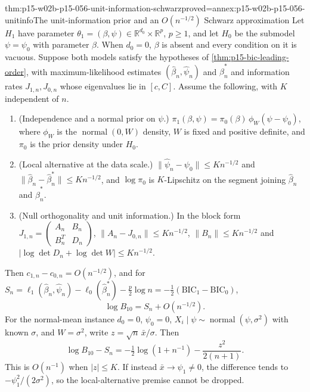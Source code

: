 \begin{hbtheorem}{thm:p15-w02b-p15-056-unit-information-schwarz}{proved=annex:p15-w02b-p15-056-unitinfo}{The unit-information prior and an \(O(n^{-1/2})\) Schwarz approximation}
Let \(H_1\) have parameter \(\theta_1=(\beta,\psi)\in\mathbb R^{d_0}\times\mathbb R^p\),
\(p\geq1\), and let \(H_0\) be the submodel \(\psi=\psi_0\) with
parameter \(\beta\). When \(d_0=0\), \(\beta\) is absent and every
condition on it is vacuous. Suppose both models satisfy the hypotheses
of \cref{thm:p15-bic-leading-order}, with maximum-likelihood estimates
\((\widehat\beta_n,\widehat\psi_n)\) and \(\widehat\beta^*_n\) and
information rates \(J_{1,n},J_{0,n}\) whose eigenvalues lie in
\([c,C]\). Assume the following, with \(K\) independent of \(n\).
\begin{enumerate}
\item (Independence and a normal prior on \(\psi\).)
\(\pi_1(\beta,\psi)=\pi_0(\beta)\,\phi_W(\psi-\psi_0)\), where \(\phi_W\)
is the \(\operatorname{normal}(0,W)\) density, \(W\) is fixed and
positive definite, and \(\pi_0\) is the prior density under \(H_0\).
\item (Local alternative at the data scale.)
\(\|\widehat\psi_n-\psi_0\|\leq Kn^{-1/2}\) and
\(\|\widehat\beta_n-\widehat\beta^*_n\|\leq Kn^{-1/2}\), and
\(\log\pi_0\) is \(K\)-Lipschitz on the segment joining
\(\widehat\beta_n\) and \(\widehat\beta^*_n\).
\item (Null orthogonality and unit information.) In the block form
\(J_{1,n}=\left(\begin{smallmatrix}A_n&B_n\\B_n^T&D_n\end{smallmatrix}\right)\),
\(\|A_n-J_{0,n}\|\leq Kn^{-1/2}\), \(\|B_n\|\leq Kn^{-1/2}\) and
\(|\log\det D_n+\log\det W|\leq Kn^{-1/2}\).
\end{enumerate}
Then \(c_{1,n}-c_{0,n}=O(n^{-1/2})\), and for
\(S_n=\ell_1(\widehat\beta_n,\widehat\psi_n)-\ell_0(\widehat\beta^*_n)-\tfrac p2\log n
 =-\tfrac12(\mathrm{BIC}_1-\mathrm{BIC}_0)\),
\[
 \log B_{10}=S_n+O(n^{-1/2}).
\]
For the normal-mean instance \(d_0=0\), \(\psi_0=0\),
\(X_i\mid\psi\sim\operatorname{normal}(\psi,\sigma^2)\) with known
\(\sigma\), and \(W=\sigma^2\), write \(z=\sqrt n\,\bar x/\sigma\). Then
\[
 \log B_{10}-S_n=-\tfrac12\log(1+n^{-1})-\frac{z^2}{2(n+1)} .
\]
This is \(O(n^{-1})\) when \(|z|\leq K\). If instead \(\bar x\to\psi_1\neq0\),
the difference tends to \(-\psi_1^2/(2\sigma^2)\), so the local-alternative
premise cannot be dropped.
\end{hbtheorem}

